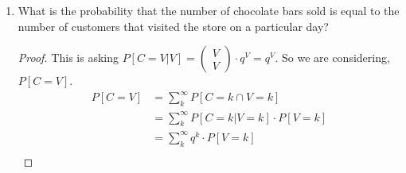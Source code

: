 \documentclass[a4paper]{article}
\begin{document}
\begin{enumerate}
\begin{enumerate}
\begin{proof}
           \begin{align*}
             E[C] = E_v[E_c[C|V]] &= E_V[\sum_{k=1}^{v} k \cdot P[C=k|V=v]]  \\
                                  &= E_V[\sum_{k=1}^{v} \begin{pmatrix} v\\ k \end{pmatrix} q^{k}(1-q)^{v-k}] \\
                                  &= \sum_{v=1}^{\infty} [\sum_{k=1}^{v}  \begin{pmatrix} v\\ k \end{pmatrix} q^{k}(1-q)^{v-k}] \cdot P[V=v] \\
                                  &= \sum_{k=1}^{v} q^{k}  \sum_{v=1}^{\infty} \begin{pmatrix} v\\ k \end{pmatrix} (1-q)^{v-k} \cdot P[V=v] \\
           .\end{align*}
           \begin{align*}
             E[C] = E_v[E_C[C|V]] &= E_v[E_C[bin(V,q)]] \\
                                  &= E_v[V \cdot q] \\
                                  &= q \cdot E_v[V] \\
                                  &= q \cdot \frac{1}{p} \\
                                  &= \frac{q}{p}
           .\end{align*}
         \end{proof}
       \item What is the probability that the number of chocolate bars sold is equal to the number of customers that visited the store on a particular day?
         \begin{proof}
           This is asking $P[C=V|V] = \begin{pmatrix} V \\ V \end{pmatrix} \cdot q^{V} = q^{V}$. So we are considering, $P[C=V]$. 
            \begin{align*}
              P[C=V] &= \sum_{k}^{\infty} P[C = k \cap V=k] \\
                     &= \sum_{k}^{\infty} P[C=k | V=k] \cdot P[V=k] \\
                     &= \sum_{k}^{\infty} q^{k} \cdot P[V=k]\\

\end{align*}
\end{proof}
\end{enumerate}
\end{enumerate}
\end{document}
